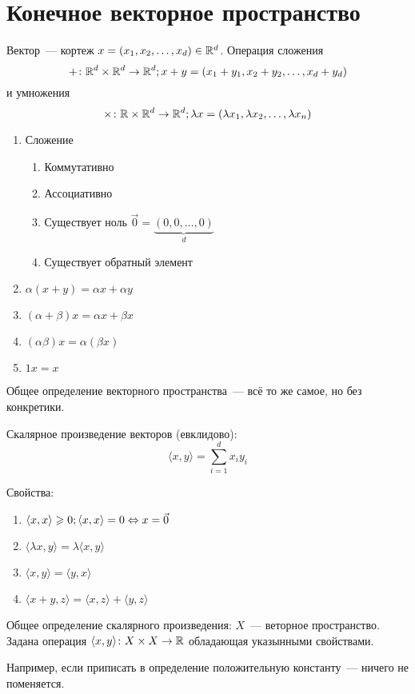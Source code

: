 \section{Конечное векторное пространство}

\begin{Def}
Вектор~--- кортеж $x = (x_1, x_2, \ldots, x_d) \in \mathbb{R}^d$. Операция сложения 
$$+\colon \mathbb{R}^d \times \mathbb{R}^d \rightarrow \mathbb{R}^d;x+y = (x_1+y_1, x_2+y_2, \ldots, x_d + y_d)$$ 
и умножения 
$$\times\colon \mathbb{R} \times \mathbb{R}^d \rightarrow \mathbb{R}^d; \lambda x = (\lambda x_1, \lambda x_2, \ldots, \lambda x_n)$$
\end{Def}
\begin{enumerate}
\item Сложение
\begin{enumerate}
\item Коммутативно
\item Ассоциативно
\item Существует ноль $\vec 0 = \underbrace{(0, 0, \ldots, 0)}_d$
\item Существует обратный элемент
\end{enumerate}
\item $\alpha (x + y) = \alpha x + \alpha y$
\item $(\alpha + \beta) x = \alpha x + \beta x$
\item $(\alpha\beta)x = \alpha(\beta x)$
\item $1x = x$
\end{enumerate}
\begin{Def}
Общее определение векторного пространства~--- всё то же самое, но без конкретики.
\end{Def}

\begin{Def}
Скалярное произведение векторов (евклидово):
$$\langle x, y\rangle = \sum_{i=1}^d x_iy_i$$
\end{Def}
Свойства:~%
\begin{enumerate}
\item $\langle x, x\rangle \geqslant 0; \langle x, x\rangle = 0 \Leftrightarrow x = \vec 0$
\item $\langle \lambda x, y\rangle = \lambda \langle x, y\rangle$
\item $\langle x, y\rangle = \langle y, x\rangle$
\item $\langle x + y, z\rangle = \langle x, z\rangle + \langle y, z\rangle$
\end{enumerate}

\begin{Def}
Общее определение скалярного произведения: $X$~--- веторное пространство. Задана операция $\langle x,y\rangle\colon X \times X \rightarrow \mathbb{R}$ обладающая указынными свойствами.
\end{Def}
Например, если приписать в определение положительную константу~--- ничего не поменяется.

